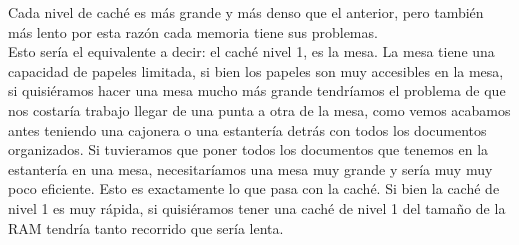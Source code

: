 \documentclass{article}
\begin{document}
Cada nivel de caché es más grande y más denso que el anterior, pero también más lento por esta razón cada memoria tiene sus problemas.\\

Esto sería el equivalente a decir: el caché nivel 1, es la mesa. La mesa tiene una capacidad de papeles limitada, si bien los papeles son muy accesibles en la mesa, si quisiéramos hacer una mesa mucho más grande tendríamos el problema de que nos costaría trabajo llegar de una punta a otra de la mesa, como vemos acabamos antes teniendo una cajonera o una estantería detrás con todos los documentos organizados. Si tuvieramos que poner todos los documentos que tenemos en la estantería en una mesa, necesitaríamos una mesa muy grande y sería muy muy poco eficiente. Esto es exactamente lo que pasa con la caché. Si bien la caché de nivel 1 es muy rápida, si quisiéramos tener una caché de nivel 1 del tamaño de la RAM tendría tanto recorrido que sería lenta.\\ 



\end{document}
